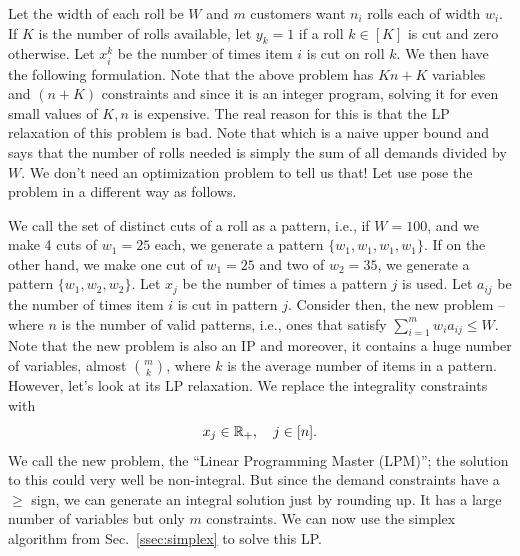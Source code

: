 \documentclass[letterpaper, 10pt, twocolumn, reqno]{amsart}
\begin{document}
Let the width of each roll be $W$ and $m$ customers want $n_i$ rolls each of width $w_i$. If $K$ is the number of rolls available, let $y_k = 1$ if a roll $k \in [K]$ is cut and zero otherwise. Let $x_i^k$ be the number of times item $i$ is cut on roll $k$. We then have the following formulation.
Note that the above problem has $Kn + K$ variables and $(n+K)$ constraints and since it is an integer program, solving it for even small values of $K, n$ is expensive. The real reason for this is that the LP relaxation of this problem is bad. Note that
which is a naive upper bound and says that the number of rolls needed is simply the sum of all demands divided by $W$. We don't need an optimization problem to tell us that! Let use pose the problem in a different way as follows.

We call the set of distinct cuts of a roll as a pattern, i.e., if $W=100$, and we make 4 cuts of $w_1 = 25$ each, we generate a pattern $\{ w_1, w_1, w_1, w_1 \}$. If on the other hand, we make one cut of $w_1 =25$ and two of $w_2 = 35$, we generate a pattern $\{ w_1, w_2, w_2 \}$. Let $x_j$ be the number of times a pattern $j$ is used. Let $a_{ij}$ be the number of times item $i$ is cut in pattern $j$. Consider then, the new problem --
where $n$ is the number of valid patterns, i.e., ones that satisfy $\sum_{i=1}^m w_i a_{ij} \leq W$. Note that the new problem is also an IP and moreover, it contains a huge number of variables, almost $m \choose k$, where $k$ is the average number of items in a pattern. However, let's look at its LP relaxation. We replace the integrality constraints with
$$
x_j \in \mathbb{R}_+,\quad j \in [n].
$$
We call the new problem, the ``Linear Programming Master (LPM)''; the solution to this could very well be non-integral. But since the demand constraints have a $\geq$ sign, we can generate an integral solution just by rounding up. It has a large number of variables but only $m$ constraints. We can now use the simplex algorithm from Sec.~\ref{ssec:simplex} to solve this LP.
\end{document}
